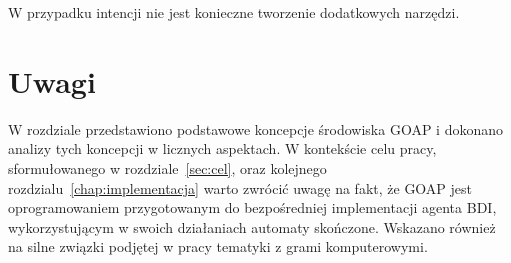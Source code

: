 W przypadku intencji nie jest konieczne tworzenie dodatkowych narzędzi. 

\section{Uwagi}
\label{sec:uwagi}
W rozdziale przedstawiono podstawowe koncepcje środowiska GOAP i dokonano analizy tych koncepcji w licznych aspektach. W kontekście celu pracy, sformułowanego w rozdziale~\ref{sec:cel}, oraz kolejnego rozdzialu~\ref{chap:implementacja} warto zwrócić uwagę na fakt, że GOAP jest oprogramowaniem przygotowanym do bezpośredniej implementacji agenta BDI, wykorzystującym w swoich działaniach automaty skończone. Wskazano również na silne związki podjętej w pracy tematyki z grami komputerowymi.







